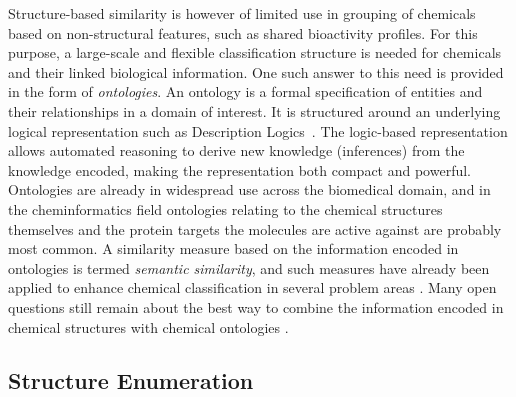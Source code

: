 \documentclass{sig-alternate}
\begin{document}
%
Structure-based similarity is however of
limited use in grouping of chemicals based on non-structural features, such as
shared bioactivity profiles. For this purpose, a large-scale and flexible
classification structure is needed for chemicals and their linked biological
information. One such answer to this need is provided in the form of \emph{ontologies}.
An ontology is a formal specification of entities and their relationships in a
domain of interest. It is structured around an underlying logical representation
such as Description Logics~\cite{baaderdl2007}. The logic-based representation allows
automated reasoning to derive new knowledge (inferences) from the knowledge
encoded, making the representation both compact and powerful.
Ontologies are already in widespread use across the biomedical domain, and in the cheminformatics field ontologies
relating to the chemical structures themselves and the protein targets the molecules are active against are probably
most common. A
similarity measure based on the information encoded in ontologies is termed
\emph{semantic similarity}, and such measures have already been applied to enhance
chemical classification in several problem areas \cite{couto2010}. Many open
questions still remain about the best way to combine the information encoded in
chemical structures with chemical ontologies \cite{hastingsowled2010}.

\subsection{Structure Enumeration}
\label{sec:struct-enum}
\end{document}
